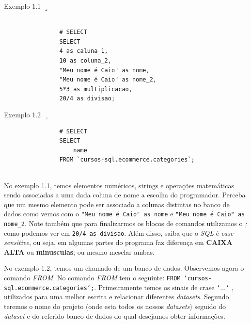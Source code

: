 \documentclass[a4paper]{article}
\begin{document}
            \bigskip
            
            Exemplo 1.1 \(\lrcorner\)
                
                \begin{verbatim}
                
                # SELECT            
                SELECT
                4 as caluna_1,
                10 as coluna_2,
                "Meu nome é Caio" as nome,
                "Meu nome é Caio" as nome_2,
                5*3 as multiplicacao,
                20/4 as divisao;
                \end{verbatim}
        
            \bigskip
            
            Exemplo 1.2 \(\lrcorner\)
            
                \begin{verbatim}
                # SELECT                
                SELECT
                    name
                FROM `cursos-sql.ecommerce.categories`;
                
                \end{verbatim}
            
            No exemplo 1.1, temos elementos numéricos, strings e operações matemáticas sendo associadas a uma dada coluna de nome a escolha do programador. Perceba que um mesmo elemento pode ser associado a colunas distintas no banco de dados como vemos com o \texttt{"Meu nome é Caio" as nome} e \texttt{"Meu nome é Caio" as nome\_2}. Note também que para finalizarmos os blocos de comandos utilizamos o \textit{;} como podemos ver em \texttt{20/4 as divisao}. Além disso, saiba que o \textit{SQL} é \textit{case sensitive}, ou seja, em algumas partes do programa faz diferença em \textbf{CAIXA ALTA} ou \textbf{minusculas}; ou mesmo mesclar ambas.
            
            No exemplo 1.2, temos um chamado de um banco de dados. Observemos agora o comando \textit{FROM}. No comando \textit{FROM} tem o seguinte: \texttt{FROM `cursos-sql.ecommerce.categories`;}. Primeiramente temos os sinais de crase \texttt{`\(\ldots\)`} \hspace{0.1em}, utilizados para uma melhor escrita e relacionar diferentes \textit{datasets}. Segundo teremos o nome do projeto (onde esta todos os nossos \textit{datasets}) seguido do \textit{dataset} e do referido banco de dados do qual desejamos obter informações.
            
\end{document}

